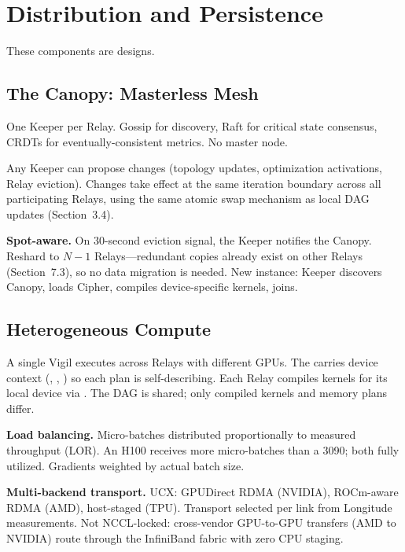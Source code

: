 
\section{Distribution and Persistence}\label{sec:distribution}

These components are designs.

\subsection{The Canopy: Masterless Mesh}

One Keeper per Relay.
Gossip for discovery, Raft for critical state consensus, CRDTs for eventually-consistent metrics.
No master node.

Any Keeper can propose changes (topology updates, optimization activations, Relay eviction).
Changes take effect at the same iteration boundary across all participating Relays, using the same atomic swap mechanism as local DAG updates (Section~3.4).

\textbf{Spot-aware.}
On 30-second eviction signal, the Keeper notifies the Canopy.
Reshard to $N{-}1$ Relays---redundant copies already exist on other Relays (Section~7.3), so no data migration is needed.
New instance: Keeper discovers Canopy, loads Cipher, compiles device-specific kernels, joins.

\subsection{Heterogeneous Compute}

A single Vigil executes across Relays with different GPUs.
The  carries device context (, , ) so each plan is self-describing.
Each Relay compiles kernels for its local device via .
The DAG is shared; only compiled kernels and memory plans differ.

\textbf{Load balancing.}
Micro-batches distributed proportionally to measured throughput (LOR).
An H100 receives more micro-batches than a 3090; both fully utilized.
Gradients weighted by actual batch size.

\textbf{Multi-backend transport.}
UCX: GPUDirect RDMA (NVIDIA), ROCm-aware RDMA (AMD), host-staged (TPU).
Transport selected per link from Longitude measurements.
Not NCCL-locked: cross-vendor GPU-to-GPU transfers (AMD to NVIDIA) route through the InfiniBand fabric with zero CPU staging.

